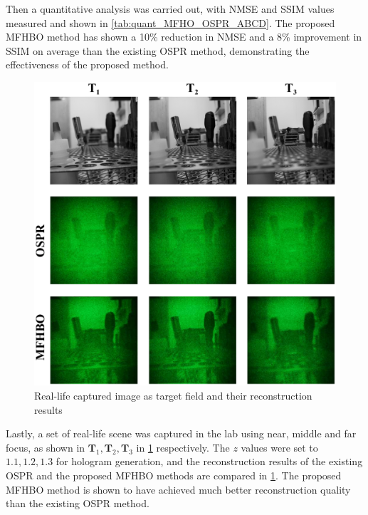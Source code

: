 	Then a quantitative analysis was carried out, with NMSE and SSIM values measured and shown in \cref{tab:quant_MFHO_OSPR_ABCD}. The proposed MFHBO method has shown a 10\% reduction in NMSE and a 8\% improvement in SSIM on average than the existing OSPR method, demonstrating the effectiveness of the proposed method.


	\begin{figure}[h!t]
		\centering
		\includegraphics[width=1.0\textwidth]{MFHO_OSPR_Pen_holder.pdf}
		\caption{Real-life captured image as target field and their reconstruction results}
		\label{fig:MFHO_OSPR_Pen_holder}
	\end{figure}

	Lastly, a set of real-life scene was captured in the lab using near, middle and far focus, as shown in $\textbf{T}_1, \textbf{T}_2, \textbf{T}_3$ in \cref{fig:MFHO_OSPR_Pen_holder} respectively. The $z$ values were set to $1.1, 1.2, 1.3$ for hologram generation, and the reconstruction results of the existing OSPR and the proposed MFHBO methods are compared in \cref{fig:MFHO_OSPR_Pen_holder}. The proposed MFHBO method is shown to have achieved much better reconstruction quality than the existing OSPR method.

